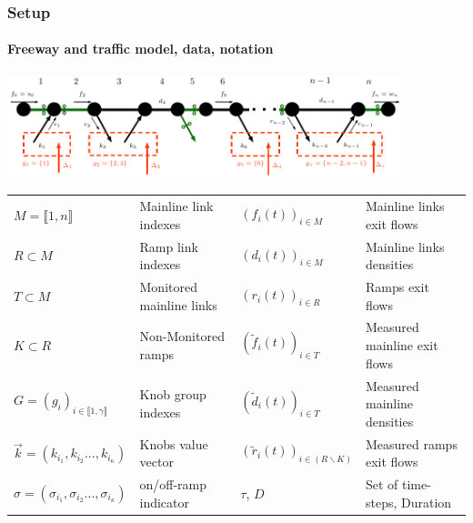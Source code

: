\documentclass[fleqn]{beamer}
\begin{document}
\begin{frame}
	\frametitle{Setup}
	\framesubtitle{Freeway and traffic model, data, notation}
	\begin{center}
		\includegraphics[width=4.5in]{figures/presentation_scheme.pdf}
	\end{center}
	\scriptsize{\begin{tabular}{llll}
		$M=\llbracket 1,n \rrbracket$ & Mainline link indexes  & $(f_{i}(t))_{i\in{M}}$ & Mainline links exit flows\\
		$R\subset{M}$ & Ramp link indexes & $(d_{i}(t))_{i\in{M}}$ & Mainline links densities\\
		$T\subset{M}$ & Monitored mainline links & $(r_{i}(t))_{i\in{R}}$ & Ramps exit flows\\
		$K\subset{R}$ & Non-Monitored ramps & $(\widetilde{f}_{i}(t))_{i\in{T}}$ & Measured mainline exit flows\\
		$G=(g_{i})_{i\in{\llbracket 1,\gamma \rrbracket}}$ & Knob group indexes  & $(\widetilde{d}_{i}(t))_{i\in{T}}$ & Measured mainline densities\\
		$\vec{k}=(k_{i_{1}},k_{i_{2}}...,k_{i_{\kappa}})$ & Knobs value vector  & $(\widetilde{r}_{i}(t))_{i\in{(R\backslash K)}}$ & Measured ramps exit flows\\
		$\sigma=(\sigma_{i_{1}},\sigma_{i_{2}}...,\sigma_{i_{\kappa}})$ & on/off-ramp indicator & $\tau$, $D$ & Set of time-steps, Duration\\
		
	\end{tabular}} 
\end{frame}
\end{document}
